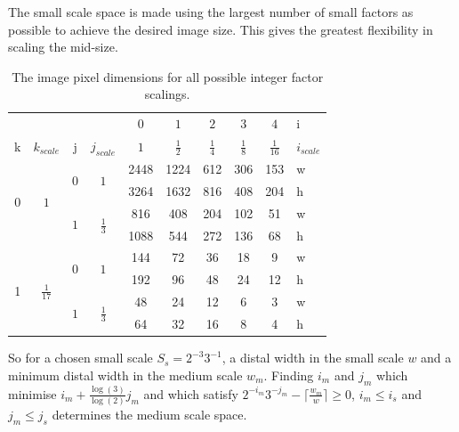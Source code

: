 The small scale space is made using the largest number of small factors as possible to achieve the desired image size. This gives the greatest flexibility in scaling the mid-size.
\begin{table}[h]
\centering
\begin{tabular}{|cc|cc|c|c|c|c|c|l|}
\cline{5-10}
\multicolumn{3}{c}{ }  & & $0$ & $1$ & $2$ & $3$ & $4$ & i\\
\cline{1-10}
k & $k_{scale}$ &j & $j_{scale}$ & $1$ & $\frac{1}{2}$ & $\frac{1}{4}$ & $\frac{1}{8}$ & $\frac{1}{16}$ & $i_{scale}$\\
  \hline \hline
\multirow{4}{*}{$0$} & \multirow{4}{*}{$1$} & \multirow{2}{*}{$0$} & \multirow{2}{*}{$1$} & 
 2448 & 1224  &  612  & 306  & 153 & w \\
  &  &  & & 
  3264  & 1632  & 816  & 408  & 204  & h\\
  \cline{3-10}
 &  & \multirow{2}{*}{$1$} & \multirow{2}{*}{$\frac{1}{3}$} & 
 816  & 408  & 204  & 102  & 51  & w \\
 &  &  & & 
  1088  & 544   & 272  & 136  & 68  & h \\
\hline 
  \hline
\multirow{4}{*}{1} & \multirow{4}{*}{ $\frac{1}{17}$ } & \multirow{2}{*}{$0$} & \multirow{2}{*}{$1$} & 
 144  & 72  & 36  & 18  & 9 & w \\
 &  & & & 
  192  & 96  & 48  & 24  & 12  & h \\
    \cline{3-10}
 &  &  \multirow{2}{*}{$1$} & \multirow{2}{*}{$\frac{1}{3}$} & 
 48  & 24   & 12  & 6   & 3 & w \\
   &  &   & & 
  64  & 32  & 16  & 8  & 4  & h \\
\hline 
\end{tabular}
\caption{The image pixel dimensions for all possible integer factor scalings.}
\end{table}

So for a chosen small scale $S_s = 2^{-3} 3^{-1}$, a distal width in the small scale $w$ and a minimum distal width in the medium scale $w_m$. 
Finding  $i_m$ and $j_m$ which minimise $i_m + \frac{\log(3)}{\log(2)} j_m$  and which satisfy  $2^{-i_m} 3^{-j_m} - \lceil \frac{w_m}{w} \rceil \ge 0$, $i_m\le i_s$ and $j_m \le j_s$ determines the medium scale space.

